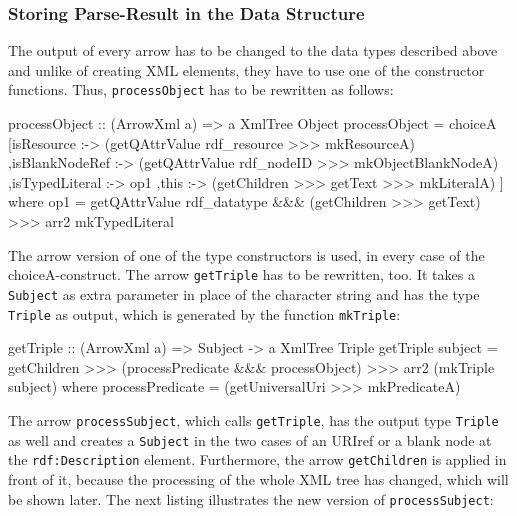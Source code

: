 \documentclass[11pt,a4paper,headsepline, bibtotoc]{scrreprt}
\begin{document}
\subsubsection{Storing Parse-Result in the Data Structure}
The output of every arrow has to be changed to the data types described above and unlike of creating XML elements, they have to use one of the constructor functions. Thus, \texttt{processObject} has to be rewritten as follows:
\begin{code}[basicstyle=\ttfamily\small]
processObject :: (ArrowXml a) => a XmlTree Object 
processObject 
  = choiceA
    [isResource     :-> (getQAttrValue rdf_resource 
                         >>> mkResourceA)
    ,isBlankNodeRef :-> (getQAttrValue rdf_nodeID 
                         >>> mkObjectBlankNodeA)
    ,isTypedLiteral :-> op1
    ,this           :-> (getChildren 
                         >>> getText >>> mkLiteralA)
    ]
    where 
    op1 = getQAttrValue rdf_datatype &&& (getChildren >>> getText)  
          >>> arr2 mkTypedLiteral
\end{code}
The arrow version of one of the type constructors is used, in every case of the choiceA-construct. The arrow \texttt{getTriple} has to be rewritten, too. It takes a \texttt{Subject} as extra parameter in place of the character string and has the type \texttt{Triple} as output, which is generated by the function \texttt{mkTriple}:
\begin{code}
getTriple :: (ArrowXml a) => Subject -> a XmlTree Triple
getTriple subject
  = getChildren 
    >>> (processPredicate &&& processObject) 
    >>> arr2 (mkTriple subject)
    where
    processPredicate = (getUniversalUri >>> mkPredicateA)
\end{code}  
The arrow \texttt{processSubject}, which calls \texttt{getTriple}, has the output type \texttt{Triple} as well and creates a \texttt{Subject} in the two cases of an URIref or a blank node at the \texttt{rdf:Description} element. Furthermore, the arrow \texttt{getChildren} is applied in front of it, because the processing of the whole XML tree has changed, which will be shown later. The next listing illustrates the new version of \texttt{processSubject}:
\end{document}
